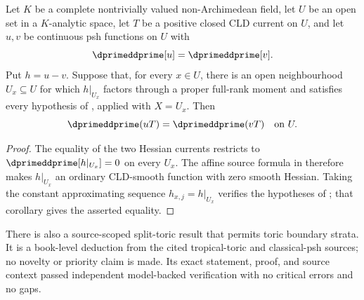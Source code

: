 \begin{corollary}
\label{cor:ch18-local-proper-full-rank-moment-bt}
Let \(K\) be a complete nontrivially valued non-Archimedean field, let \(U\) be
an open set in a \(K\)-analytic space, let \(T\) be a positive closed CLD current
on \(U\), and let \(u,v\) be continuous psh functions on \(U\) with
\[
                    \dprimeddprime[u]=\dprimeddprime[v].
\]
Put \(h=u-v\).  Suppose that, for every \(x\in U\), there is an open
neighbourhood \(U_x\subseteq U\) for which \(h|_{U_x}\) factors through a
proper full-rank moment and satisfies every hypothesis of
, applied with \(X=U_x\).  Then
\[
                 \dprimeddprime(uT)=\dprimeddprime(vT)
                 \quad\text{on }U.
\]
\end{corollary}

\begin{proof}
The equality of the two Hessian currents restricts to
\(\dprimeddprime[h|_{U_x}]=0\) on every \(U_x\).  The affine source formula
in  therefore makes \(h|_{U_x}\) an
ordinary CLD-smooth function with zero smooth Hessian.  Taking the constant
approximating sequence \(h_{x,j}=h|_{U_x}\) verifies the hypotheses of
; that corollary gives the
asserted equality.
\end{proof}

There is also a source-scoped split-toric result that permits toric boundary
strata.  It is a book-level deduction from the cited tropical-toric and
classical-psh sources; no novelty or priority claim is made.  Its exact
statement, proof, and source context passed independent model-backed
verification with no critical errors and no gaps.








